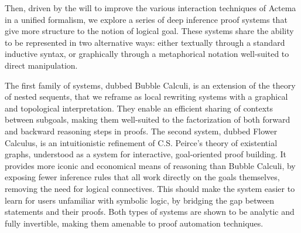 
Then, driven by the will to improve the various interaction techniques of Actema
in a unified formalism, we explore a series of deep inference proof systems that
give more structure to the notion of logical goal. These systems share the
ability to be represented in two alternative ways: either textually through a
standard inductive syntax, or graphically through a metaphorical notation
well-suited to direct manipulation.

The first family of systems, dubbed Bubble Calculi, is an extension of the
theory of nested sequents, that we reframe as local rewriting systems with a
graphical and topological interpretation. They enable an efficient sharing of
contexts between subgoals, making them well-suited to the factorization of both
forward and backward reasoning steps in proofs. The second system, dubbed Flower
Calculus, is an intuitionistic refinement of C.S. Peirce's theory of existential
graphs, understood as a system for interactive, goal-oriented proof building. It
provides more iconic and economical means of reasoning than Bubble Calculi, by
exposing fewer inference rules that all work directly on the goals themselves,
removing the need for logical connectives. This should make the system easier to
learn for users unfamiliar with symbolic logic, by bridging the gap between
statements and their proofs. Both types of systems are shown to be analytic and
fully invertible, making them amenable to proof automation techniques.


